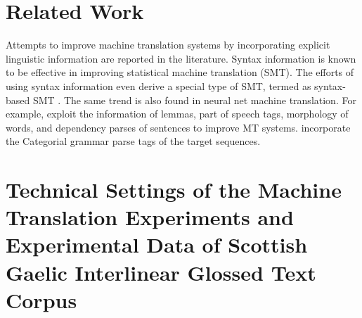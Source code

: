 \documentclass[final]{ua-thesis}
\numberwithin{equation}{section}
\begin{document}
\section{Related Work}\label{relate_work}
Attempts to improve machine translation systems by incorporating explicit linguistic information are reported in the literature. Syntax information is known to be effective in improving statistical machine translation (SMT). The efforts of using syntax information even derive a special type of SMT, termed as syntax-based SMT \citep{williams2016syntax}. The same trend is also found in neural net machine translation. For example, \citet{sennrich2016linguistic} exploit the information of lemmas, part of speech tags, morphology of words, and dependency parses of sentences to improve MT systems. \citet{ccg_target_seq} incorporate the Categorial grammar parse tags of the target sequences.


\section{Technical Settings of the Machine Translation Experiments and Experimental Data of Scottish Gaelic Interlinear Glossed Text Corpus}\label{sec:experimet_setting}
\end{document}
